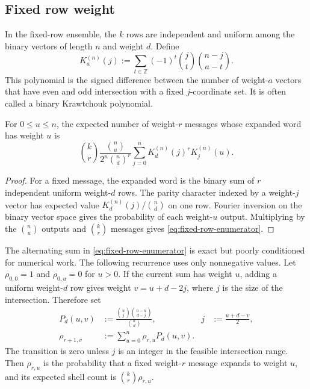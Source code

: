 \subsection{Fixed row weight}

In the fixed-row ensemble, the $k$ rows are independent and uniform among the
binary vectors of length $n$ and weight $d$.  Define
\begin{equation}
 K_a^{(n)}(j):=\sum_{t\in\mathbb Z}(-1)^t
   \binom jt\binom{n-j}{a-t}.
 \label{eq:krawtchouk-definition}
\end{equation}
This polynomial is the signed difference between the number of weight-$a$
vectors that have even and odd intersection with a fixed $j$-coordinate set.
It is often called a binary Krawtchouk polynomial.

\begin{lemma}
\label{lem:fixed-row-enumerator}
For $0\leq u\leq n$, the expected number of weight-$r$ messages whose
expanded word has weight $u$ is
\begin{equation}
 \binom{k}{r}\frac{\binom{n}{u}}{2^n\binom{n}{d}^{r}}
 \sum_{j=0}^{n}K_d^{(n)}(j)^rK_j^{(n)}(u).
 \label{eq:fixed-row-enumerator}
\end{equation}
\end{lemma}

\begin{proof}
For a fixed message, the expanded word is the binary sum of $r$ independent
uniform weight-$d$ rows.  The parity character indexed by a weight-$j$ vector
has expected value $K_d^{(n)}(j)/\binom nd$ on one row.  Fourier inversion on
the binary vector space gives the probability of each weight-$u$ output.
Multiplying by the $\binom nu$ outputs and $\binom kr$ messages gives
\eqref{eq:fixed-row-enumerator}.
\end{proof}

The alternating sum in \eqref{eq:fixed-row-enumerator} is exact but poorly
conditioned for numerical work.  The following recurrence uses only
nonnegative values.  Let $\rho_{0,0}=1$ and $\rho_{0,u}=0$ for $u>0$.  If the
current sum has weight $u$, adding a uniform weight-$d$ row gives weight
$v=u+d-2j$, where $j$ is the size of the intersection.  Therefore set
\begin{align}
 P_d(u,v)&:=\frac{\binom uj\binom{n-u}{d-j}}{\binom nd},
 &j&:=\frac{u+d-v}{2},
 \label{eq:fixed-row-transition}\\
 \rho_{r+1,v}&:=\sum_{u=0}^{n}\rho_{r,u}P_d(u,v).
 \label{eq:fixed-row-recurrence}
\end{align}
The transition is zero unless $j$ is an integer in the feasible intersection
range.  Then $\rho_{r,u}$ is the probability that a fixed weight-$r$ message
expands to weight $u$, and its expected shell count is
$\binom kr\rho_{r,u}$.

